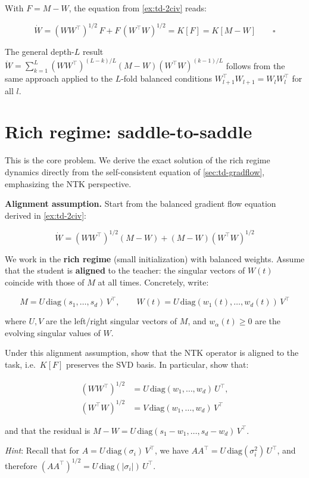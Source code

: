 \documentclass[11pt]{article}
\begin{document}
\begin{solution}[ex:td-2d]
With \(F = M - W\), the equation from \cref{ex:td-2civ} reads:

\[\dot{W} = (WW^\top)^{1/2}\,F + F\,(W^\top W)^{1/2} = K[F] = K[M - W] \qquad \square\]

The general depth-\(L\) result
\(\dot{W} = \sum_{k=1}^{L}(WW^\top)^{(L-k)/L}(M-W)(W^\top W)^{(k-1)/L}\)
follows from the same approach applied to the \(L\)-fold balanced
conditions \(W_{l+1}^\top W_{l+1} = W_l W_l^\top\) for all \(l\).
\end{solution}

\section{Rich regime: saddle-to-saddle}
\label{sec:td-rich}

This is the core problem. We derive the exact solution of the rich
regime dynamics directly from the self-consistent equation of \cref{sec:td-gradflow},
emphasizing the NTK perspective.

\textbf{Alignment assumption.} Start from the balanced
gradient flow equation derived in \cref{ex:td-2civ}:

\[\dot{W} = (WW^\top)^{1/2}(M - W) + (M - W)(W^\top W)^{1/2}\]

We work in the \textbf{rich regime} (small initialization) with balanced
weights. Assume that the student is \textbf{aligned} to the teacher: the
singular vectors of \(W(t)\) coincide with those of \(M\) at all times.
Concretely, write:

\[M = U\,\text{diag}(s_1, \ldots, s_d)\,V^\top, \qquad W(t) = U\,\text{diag}(w_1(t), \ldots, w_d(t))\,V^\top\]

where \(U, V\) are the left/right singular vectors of \(M\), and
\(w_\alpha(t) \geq 0\) are the evolving singular values of \(W\).

\begin{exercise}
\label{ex:td-3ai}
Under this alignment assumption, show that the NTK
operator is aligned to the task, i.e.~\(K[F]\) preserves the SVD basis.
In particular, show that:

\begin{align*}
(WW^\top)^{1/2} &= U\,\text{diag}(w_1, \ldots, w_d)\,U^\top, \\
(W^\top W)^{1/2} &= V\,\text{diag}(w_1, \ldots, w_d)\,V^\top
\end{align*}

and that the residual is
\(M - W = U\,\text{diag}(s_1 - w_1, \ldots, s_d - w_d)\,V^\top\).

\emph{Hint}: Recall that for \(A = U\,\text{diag}(\sigma_i)\,V^\top\),
we have \(AA^\top = U\,\text{diag}(\sigma_i^2)\,U^\top\), and therefore
\((AA^\top)^{1/2} = U\,\text{diag}(|\sigma_i|)\,U^\top\).
\end{exercise}
\end{document}
